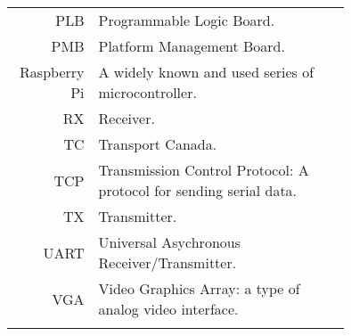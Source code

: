 \begin{tabular}[h]{rp{0.75\linewidth}}
    PLB & Programmable Logic Board. \\
    PMB & Platform Management Board. \\
    Raspberry Pi & A widely known and used series of microcontroller. \\
    RX & Receiver.\\
    TC & Transport Canada.\\
    TCP & Transmission Control Protocol: A protocol for sending serial data. \\
    TX & Transmitter.\\\
    UART & Universal Asychronous Receiver/Transmitter. \\
    VGA & Video Graphics Array: a type of analog video interface. \\
     & \\

    \hline

\end{tabular}
